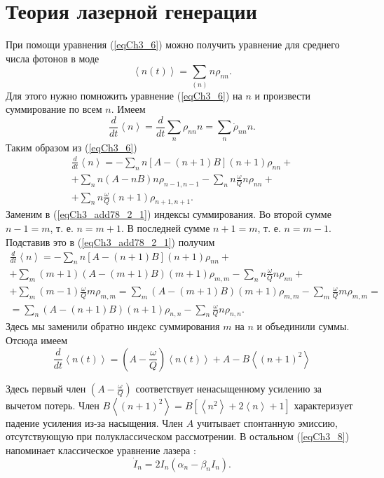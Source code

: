 \section{Теория лазерной генерации}
При помощи уравнения (\ref{eqCh3_6}) можно получить уравнение для
среднего числа фотонов в моде 
\[
\left<n\left(t\right)\right> =\sum_{(n)}n\rho_{nn}.
\]
Для этого нужно помножить уравнение (\ref{eqCh3_6}) на $n$ и
произвести суммирование по всем $n$. Имеем
\[
\frac{d}{dt}\left<n\right> = \frac{d}{dt}\sum_n\rho_{nn}n = 
\sum_n\dot{\rho}_{nn}n.
\]
Таким образом из (\ref{eqCh3_6})
\begin{eqnarray}
\frac{d}{dt}\left<n\right> = 
-\sum_n n \left[A - \left(n + 1\right)B\right]\left(n + 1\right)\rho_{nn} +
\nonumber \\
+ \sum_n n\left(A - n B\right)n \rho_{n - 1, n - 1} 
- \sum_n n\frac{\omega}{Q}n \rho_{nn} + 
\nonumber \\
+ \sum_n n \frac{\omega}{Q} \left(n + 1\right)\rho_{n + 1, n + 1}.
\label{eqCh3_add78_2_1}
\end{eqnarray}
Заменим в (\ref{eqCh3_add78_2_1}) индексы суммирования. Во второй
сумме $n - 1 = m$, т. е. $n = m + 1$. В последней сумме 
$n + 1 = m$, т. е. $n = m - 1$. Подставив это в
(\ref{eqCh3_add78_2_1}) получим
\begin{eqnarray}
\frac{d}{dt}\left<n\right>  = 
-\sum_n n \left[A - \left(n + 1\right)B\right]\left(n + 1\right)\rho_{nn} +
\nonumber \\
+ \sum_m \left(m + 1\right)\left(A - \left(m + 1\right)B\right)\left(m + 1\right) \rho_{m, m} 
- \sum_n n\frac{\omega}{Q}n \rho_{nn} + 
\nonumber \\
+ \sum_m \left(m - 1\right) \frac{\omega}{Q} m\rho_{m, m} = 
\sum_m \left(A - \left(m + 1\right) B\right)\left(m + 1\right) \rho_{m, m} - 
\sum_m \frac{\omega}{Q} m\rho_{m, m} = 
\nonumber \\
= \sum_n \left(A - \left(n + 1\right) B\right)\left(n + 1\right) \rho_{n, n} - 
\sum_n \frac{\omega}{Q} n\rho_{n, n}.
\nonumber
\end{eqnarray}
Здесь мы заменили обратно индекс суммирования $m$ на $n$ и объединили суммы.
Отсюда имеем
\begin{equation}
\frac{d}{d t}\left<n\left(t\right)\right> = 
\left(A - \frac{\omega}{Q}\right)\left<n\left(t\right)\right>
+ A - B \left<\left(n + 1\right)^2\right>
\label{eqCh3_8}
\end{equation}

Здесь первый член $\left(A - \frac{\omega}{Q}\right)$ соответствует
ненасыщенному усилению за вычетом 
потерь. Член 
$B\left<\left(n + 1\right)^2\right> = B \left[\left<n^2\right> + 2
  \left<n\right> + 1\right]$
характеризует падение усиления из-за насыщения. Член $A$
учитывает спонтанную эмиссию, отсутствующую при полуклассическом
рассмотрении. В остальном (\ref{eqCh3_8}) напоминает классическое
уравнение лазера \cite{bQuantumOpticsAndRadioPhisicsLecture1966}:
\[
\dot{I}_n = 2 I_n\left(\alpha_n - \beta_n I_n\right).
\]
